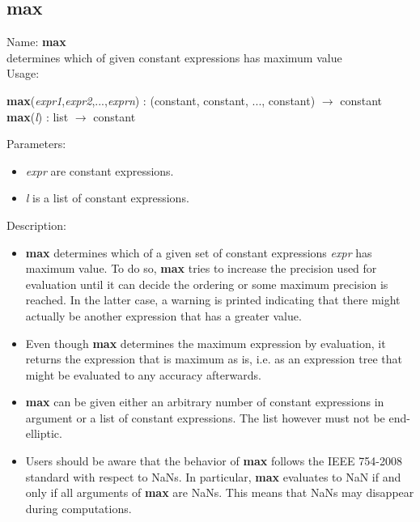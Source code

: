 \subsection{max}
\label{labmax}
\noindent Name: \textbf{max}\\
determines which of given constant expressions has maximum value\\
\noindent Usage: 
\begin{center}
\textbf{max}(\emph{expr1},\emph{expr2},...,\emph{exprn}) : (\textsf{constant}, \textsf{constant}, ..., \textsf{constant}) $\rightarrow$ \textsf{constant}\\
\textbf{max}(\emph{l}) : \textsf{list} $\rightarrow$ \textsf{constant}\\
\end{center}
Parameters: 
\begin{itemize}
\item \emph{expr} are constant expressions.
\item \emph{l} is a list of constant expressions.
\end{itemize}
\noindent Description: \begin{itemize}

\item \textbf{max} determines which of a given set of constant expressions
   \emph{expr} has maximum value. To do so, \textbf{max} tries to increase the
   precision used for evaluation until it can decide the ordering or some
   maximum precision is reached. In the latter case, a warning is printed
   indicating that there might actually be another expression that has a
   greater value.

\item Even though \textbf{max} determines the maximum expression by evaluation, it 
   returns the expression that is maximum as is, i.e. as an expression
   tree that might be evaluated to any accuracy afterwards.

\item \textbf{max} can be given either an arbitrary number of constant
   expressions in argument or a list of constant expressions. The list
   however must not be end-elliptic.

\item Users should be aware that the behavior of \textbf{max} follows the IEEE
   754-2008 standard with respect to NaNs. In particular, \textbf{max}
   evaluates to NaN if and only if all arguments of \textbf{max} are
   NaNs. This means that NaNs may disappear during computations.
\end{itemize}
